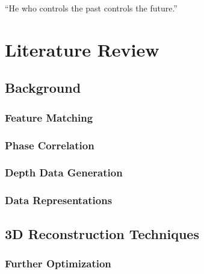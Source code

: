 \begin{savequote}[8cm]
  ``He who controls the past controls the future.''
\end{savequote}
\makeatletter
\chapter{Literature Review}
\label{ch:TheLiteratureReviewChapter}
\section{Background}

\subsection{Feature Matching}


\subsection{Phase Correlation}
\label{Sec:SuperficialPCSection}


\subsection{Depth Data Generation}
\label{DepthDataGenSection}



\subsection{Data Representations}


\section{3D Reconstruction Techniques}

\subsection{Further Optimization}


